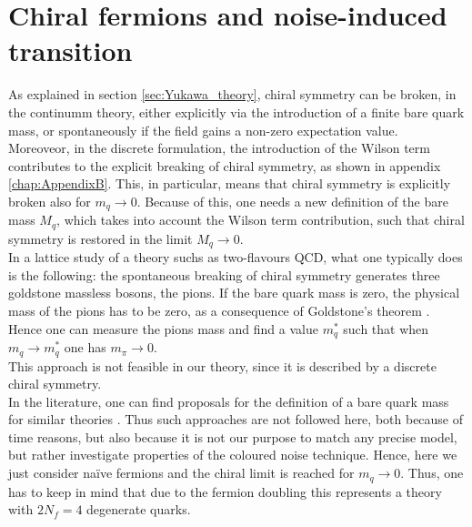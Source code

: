 \section{Chiral fermions and noise-induced transition}
\label{sec:chiral_PT}
As explained in section \ref{sec:Yukawa_theory}, chiral symmetry can be broken, in the continumm theory, either explicitly via the introduction of a finite bare quark mass, or spontaneously if the field gains a non-zero expectation value.\\
Moreoveor, in the discrete formulation, the introduction of the Wilson term contributes to the explicit breaking of chiral symmetry, as shown in appendix \ref{chap:AppendixB}. This, in particular, means that chiral symmetry is explicitly broken also for $m_q \to 0$. Because of this, one needs a new definition of the bare mass $M_q$, which takes into account the Wilson term contribution, such that chiral symmetry is restored in the limit $M_q \to 0$. \\
In a lattice study of a theory suchs as  two-flavours QCD, what one typically does \cite{rothe_LGT,gattringer_LQCD} is the following: the spontaneous breaking of chiral symmetry generates three goldstone massless bosons, the pions. If the bare quark mass is zero, the physical mass of the pions has to be zero, as a consequence of Goldstone's theorem \cite{goldstone}. Hence one can measure the pions mass and find a value $m_q^*$ such that when $m_q \to m_q^*$ one has $m_\pi \to 0$. \\
This approach is not feasible in our theory, since it is described by a discrete chiral symmetry. \\
In the literature, one can find proposals for the definition of a bare quark mass for similar theories \cite{Iwasaki:1994gq,MAIANI1986265}. Thus such approaches are not followed here, both because of time reasons, but also because it is not our purpose to match any precise model, but rather investigate properties of the coloured noise technique. Hence, here we just consider na\"ive fermions and the chiral limit is reached for $m_q \to 0$. Thus, one has to keep in mind that due to the fermion doubling this represents a theory with $2N_f = 4$ degenerate quarks. \\~\\
